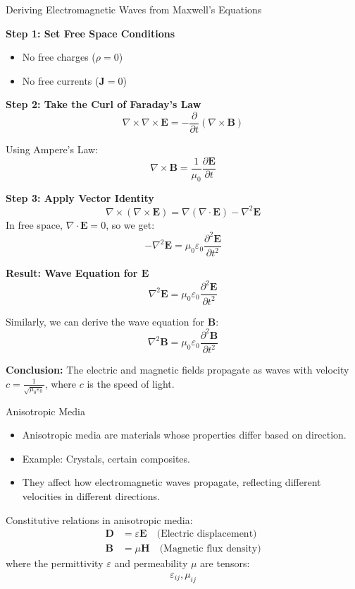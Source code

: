 \documentclass{beamer}
\begin{document}
\begin{frame}{Deriving Electromagnetic Waves from Maxwell's Equations}

\vspace{1em}
\textbf{Step 1: Set Free Space Conditions}
\begin{itemize}
    \item No free charges (\(\rho = 0\))
    \item No free currents (\(\mathbf{J} = 0\))
\end{itemize}

\vspace{1em}
\textbf{Step 2: Take the Curl of Faraday's Law}
\[
\nabla \times \nabla \times \mathbf{E} = -\frac{\partial}{\partial t} (\nabla \times \mathbf{B})
\]

\vspace{0.5em}
Using Ampere's Law:
\[
\nabla \times \mathbf{B} = \frac{1}{\mu_0} \frac{\partial \mathbf{E}}{\partial t}
\]

\textbf{Step 3: Apply Vector Identity}
\[
\nabla \times (\nabla \times \mathbf{E}) = \nabla (\nabla \cdot \mathbf{E}) - \nabla^2 \mathbf{E}
\]
In free space, \(\nabla \cdot \mathbf{E} = 0\), so we get:
\[
-\nabla^2 \mathbf{E} = \mu_0 \varepsilon_0 \frac{\partial^2 \mathbf{E}}{\partial t^2}
\]
\end{frame}
\begin{frame}

\vspace{1em}
\textbf{Result: Wave Equation for \(\mathbf{E}\)}
\[
\nabla^2 \mathbf{E} = \mu_0 \varepsilon_0 \frac{\partial^2 \mathbf{E}}{\partial t^2}
\]

Similarly, we can derive the wave equation for \(\mathbf{B}\):
\[
\nabla^2 \mathbf{B} = \mu_0 \varepsilon_0 \frac{\partial^2 \mathbf{B}}{\partial t^2}
\]

\textbf{Conclusion:} The electric and magnetic fields propagate as waves with velocity \( c = \frac{1}{\sqrt{\mu_0 \varepsilon_0}} \), where \(c\) is the speed of light.
\end{frame}

\begin{frame}{Anisotropic Media}
  \begin{itemize}
    \item Anisotropic media are materials whose properties differ based on direction.
    \item Example: Crystals, certain composites.
    \item They affect how electromagnetic waves propagate, reflecting different velocities in different directions.
  \end{itemize}
  Constitutive relations in anisotropic media:
  \begin{align*}
    \mathbf{D} &= \varepsilon \mathbf{E} \quad \text{(Electric displacement)} \\
    \mathbf{B} &= \mu \mathbf{H} \quad \text{(Magnetic flux density)}
  \end{align*}
  where the permittivity $\varepsilon$ and permeability $\mu$ are tensors:
  \begin{align*}
    \varepsilon_{ij}, \mu_{ij}
  \end{align*}
\end{frame}
\end{document}
